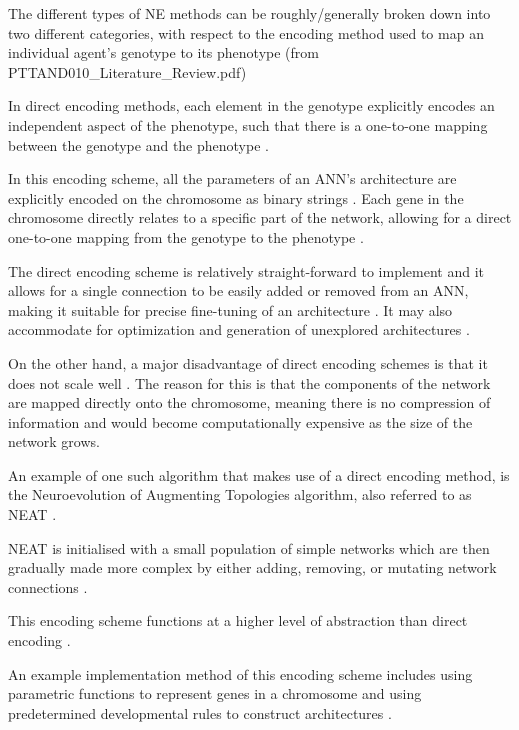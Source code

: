 The different types of NE methods can be roughly/generally broken down into two different categories, with respect to the encoding method used to map an individual agent's genotype to its phenotype (from PTTAND010_Literature_Review.pdf)




In direct encoding methods, each element in the genotype explicitly encodes an independent aspect of the phenotype, such that there is a one-to-one mapping between the genotype and the phenotype \cite{clune2011performance, stanley2009hypercube}.

In this encoding scheme, all the parameters of an ANN's architecture are explicitly encoded on the chromosome as binary strings \cite{Gomez2003}. Each gene in the chromosome directly relates to a specific part of the network, allowing for a direct one-to-one mapping from the genotype to the phenotype \cite{StanleyMiikkulainen2002}.

The direct encoding scheme is relatively straight-forward to implement and it allows for a single connection to be easily added or removed from an ANN, making it suitable for precise fine-tuning of an architecture \cite{StanleyMiikkulainen2002}.
It may also accommodate for optimization and generation of unexplored architectures \cite{miller1989designing}.

On the other hand, a major disadvantage of direct encoding schemes is that it does not scale well \cite{XinYao1999}.  The reason for this is that the components of the network are mapped directly onto the chromosome, meaning there is no compression of information and would become computationally expensive as the size of the network grows.

An example of one such algorithm that makes use of a direct encoding method, is the Neuroevolution of Augmenting Topologies algorithm, also referred to as NEAT \cite{Gomez2003}.

NEAT is initialised with a small population of simple networks which are then gradually made more complex by either adding, removing, or mutating network connections \cite{RefWorks:11, Gomez2003}.



This encoding scheme functions at a higher level of abstraction than direct encoding  \cite{Gomez2003}.

An example implementation method of this encoding scheme includes using parametric functions to represent genes in a chromosome and using predetermined developmental rules to construct architectures \cite{koutnik2010evolving}.

